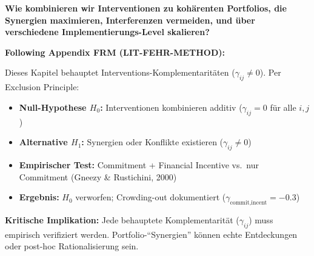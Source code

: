 
\begin{tcolorbox}[colback=red!5!white, colframe=red!75!black,
    title=Central Question]
\textbf{Wie kombinieren wir Interventionen zu kohärenten Portfolios, die Synergien maximieren, Interferenzen vermeiden, und über verschiedene Implementierungs-Level skalieren?}
\end{tcolorbox}

\begin{tcolorbox}[colback=red!5!white, colframe=red!75!black,
    title=\textbf{Methodological Note: The Exclusion Principle (Appendix FRM)}]
\textbf{Following Appendix FRM (LIT-FEHR-METHOD):}

Dieses Kapitel behauptet Interventions-Komplementaritäten ($\gamma_{ij} \neq 0$). Per Exclusion Principle:
\begin{itemize}[nosep]
    \item \textbf{Null-Hypothese $H_0$:} Interventionen kombinieren additiv ($\gamma_{ij} = 0$ für alle $i,j$)
    \item \textbf{Alternative $H_1$:} Synergien oder Konflikte existieren ($\gamma_{ij} \neq 0$)
    \item \textbf{Empirischer Test:} Commitment + Financial Incentive vs.\ nur Commitment (Gneezy \& Rustichini, 2000)
    \item \textbf{Ergebnis:} $H_0$ verworfen; Crowding-out dokumentiert ($\gamma_{\text{commit,incent}} = -0.3$)
\end{itemize}

\textbf{Kritische Implikation:} Jede behauptete Komplementarität ($\gamma_{ij}$) muss empirisch verifiziert werden. Portfolio-``Synergien'' können echte Entdeckungen oder post-hoc Rationalisierung sein.
\end{tcolorbox}


